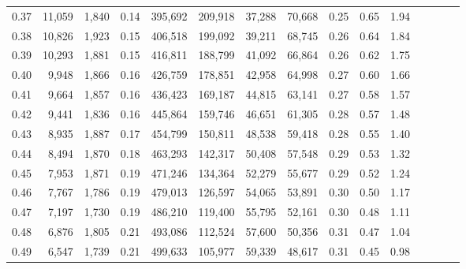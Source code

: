 \begin{tabular}{rrrcrrrrrrrrrrr}
0.37 &  11,059 &  1,840 &                                       0.14 &  395,692 &  209,918 &   37,288 &   70,668 &  0.25 &  0.65 &                         1.94 \\
0.38 &  10,826 &  1,923 &                                       0.15 &  406,518 &  199,092 &   39,211 &   68,745 &  0.26 &  0.64 &                         1.84 \\
0.39 &  10,293 &  1,881 &                                       0.15 &  416,811 &  188,799 &   41,092 &   66,864 &  0.26 &  0.62 &                         1.75 \\
0.40 &   9,948 &  1,866 &                                       0.16 &  426,759 &  178,851 &   42,958 &   64,998 &  0.27 &  0.60 &                         1.66 \\
0.41 &   9,664 &  1,857 &                                       0.16 &  436,423 &  169,187 &   44,815 &   63,141 &  0.27 &  0.58 &                         1.57 \\
0.42 &   9,441 &  1,836 &                                       0.16 &  445,864 &  159,746 &   46,651 &   61,305 &  0.28 &  0.57 &                         1.48 \\
0.43 &   8,935 &  1,887 &                                       0.17 &  454,799 &  150,811 &   48,538 &   59,418 &  0.28 &  0.55 &                         1.40 \\
0.44 &   8,494 &  1,870 &                                       0.18 &  463,293 &  142,317 &   50,408 &   57,548 &  0.29 &  0.53 &                         1.32 \\
0.45 &   7,953 &  1,871 &                                       0.19 &  471,246 &  134,364 &   52,279 &   55,677 &  0.29 &  0.52 &                         1.24 \\
0.46 &   7,767 &  1,786 &                                       0.19 &  479,013 &  126,597 &   54,065 &   53,891 &  0.30 &  0.50 &                         1.17 \\
0.47 &   7,197 &  1,730 &                                       0.19 &  486,210 &  119,400 &   55,795 &   52,161 &  0.30 &  0.48 &                         1.11 \\
0.48 &   6,876 &  1,805 &                                       0.21 &  493,086 &  112,524 &   57,600 &   50,356 &  0.31 &  0.47 &                         1.04 \\
0.49 &   6,547 &  1,739 &                                       0.21 &  499,633 &  105,977 &   59,339 &   48,617 &  0.31 &  0.45 &                         0.98 \\

\end{tabular}
